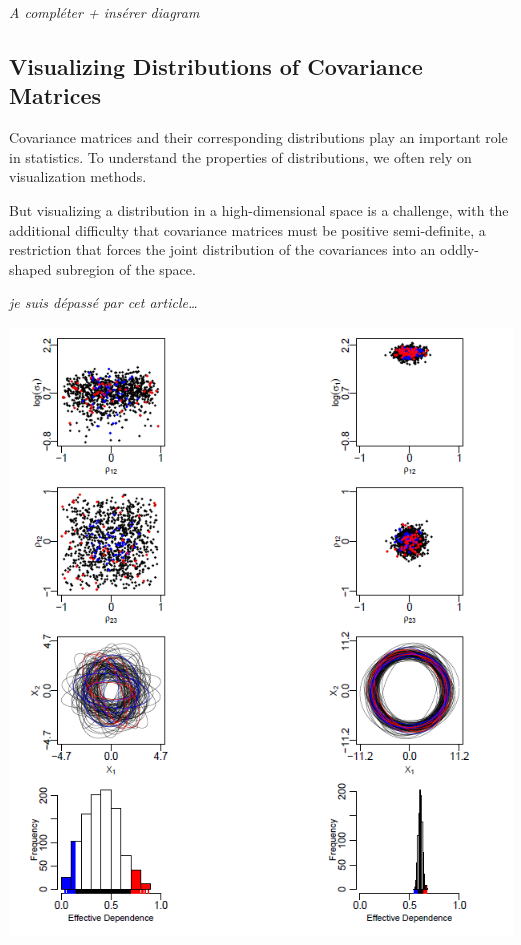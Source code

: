 \documentclass[
]{report}
\begin{document}
\emph{A compléter + insérer diagram}

\hypertarget{visualizing-distributions-of-covariance-matrices}{%
\subsection{Visualizing Distributions of Covariance Matrices}\label{visualizing-distributions-of-covariance-matrices}}

Covariance matrices and their corresponding distributions play an important role in statistics. To understand the properties of distributions, we often rely on visualization methods. \citep{VisCov}

But visualizing a distribution in a high-dimensional space is a challenge, with the additional
difficulty that covariance matrices must be positive semi-definite, a restriction that forces
the joint distribution of the covariances into an oddly-shaped subregion of the space.

\emph{je suis dépassé par cet article\ldots{}}

\includegraphics{wtf_covViz.PNG}
\end{document}
